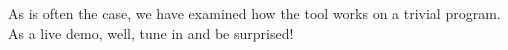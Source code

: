 As is often the case, we have examined how the tool works on a trivial program. As a live demo, well, tune in and be surprised!




